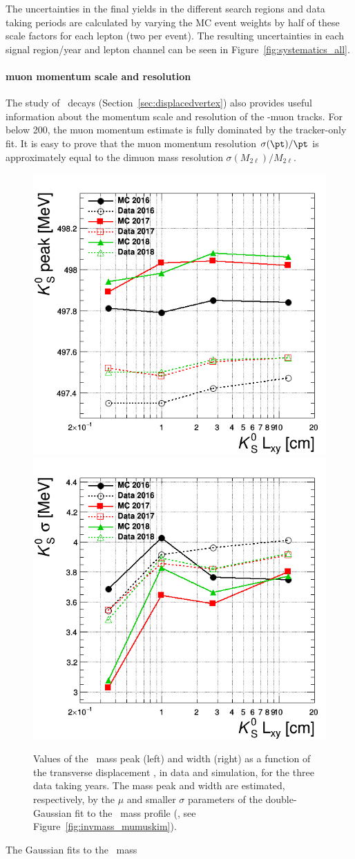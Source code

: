 The uncertainties in the final yields in the different search regions
and data taking periods are calculated by varying the MC event weights
by half of these scale factors for each \displ lepton (\ie two per
event). The resulting uncertainties in each signal region/year and
lepton channel can be seen in Figure~\ref{fig:systematics_all}. 

\paragraph{\Displ muon momentum scale and resolution}
\label{sec:nonpromptleptonscaleresol}
The study of \PKzS\ decays (Section~\ref{sec:displacedvertex}) also
provides useful information about the momentum scale and resolution of
the \displ-muon tracks. For \pt below 200\GeV, the muon momentum 
estimate is fully dominated by the tracker-only fit. It is easy to
prove that the muon momentum resolution $\sigma(\pt)/\pt$ is
approximately equal to the dimuon mass resolution
$\sigma(M_{2\ell})/M_{2\ell}$.
\begin{figure}[h!]
  \centering
  \includegraphics[width=.30\textwidth]{Figures/c6/systematics/scale_displMu.png}
  \includegraphics[width=.30\textwidth]{Figures/c6/systematics/resolution_displMu.png}
  \caption{Values of the \PKzS\ mass peak (left) and width (right) as
    a function of the transverse displacement \Deltwod, in data and
    simulation, for the three data taking years. The mass peak and
    width are estimated, respectively, by the $\mu$ and smaller
    $\sigma$ parameters of the double-Gaussian fit to the
    \PKzS\ mass profile (\eg, see Figure~\ref{fig:invmass_mumuskim}). \dani}
  \label{fig:displMuScaleResol}
\end{figure}
 The Gaussian fits to the \PKzS\ mass

